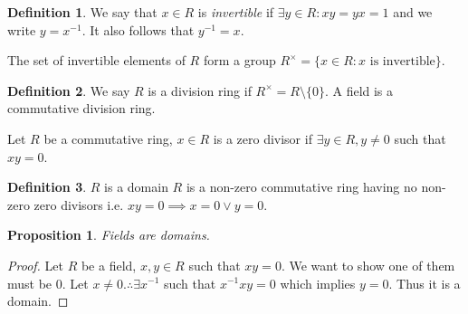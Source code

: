 \documentclass{article}
\theoremstyle{definition}
\newtheorem{definition}{Definition}[subsection]
\theoremstyle{remark}
\theoremstyle{plain}
\newtheorem{prop}{Proposition}[subsection]
\begin{document}
\begin{definition}
    We say that $x \in R$ is \textit{invertible} if $\exists y \in R: xy = yx = 1$ and we write $y = x^{-1}$. It also follows that $y^{-1} = x$. 
\end{definition}
The set of invertible elements of $R$ form a group $R^{\times} = \{x\in R: x \text{ is invertible}\}$.

\begin{definition}
    We say $R$ is a division ring if $R^{\times} = R \setminus \{0\}$. A field is a commutative division ring.
\end{definition}
Let $R$ be a commutative ring, $x \in R$ is a zero divisor if $\exists y \in R, y \neq 0$ such that $xy = 0$.

\begin{definition}
    $R$ is a domain $R$ is a non-zero commutative ring having no non-zero zero divisors i.e. $xy = 0 \implies x = 0 \lor y = 0$.
\end{definition}

\begin{prop}
    Fields are domains. 
\end{prop}
\begin{proof}
    Let $R$ be a field, $x,y \in R$ such that $xy = 0$. We want to show one of them must be 0. Let $x \neq 0. \therefore \exists x^{-1}$ such that $x^{-1}xy = 0 $ which implies $y=0$. Thus it is a domain.
\end{proof}
\end{document}

